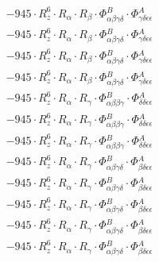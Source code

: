 \documentclass{article}
\begin{document}
\begin{subequations}
\begin{gather}
\begin{array}{c}
 \\[0.2em] 		 - 945 \cdot R_{z}^{6} \cdot R_{\alpha{}} \cdot R_{\beta{}} \cdot \Phi{}^{B}_{\alpha{}\beta{}\gamma{}\delta{}} \cdot \Phi{}^{A}_{\gamma{}\delta{}\epsilon{}\epsilon{}} 
 \\[0.2em] 		 - 945 \cdot R_{z}^{6} \cdot R_{\alpha{}} \cdot R_{\beta{}} \cdot \Phi{}^{B}_{\alpha{}\beta{}\gamma{}\delta{}} \cdot \Phi{}^{A}_{\gamma{}\delta{}\epsilon{}\epsilon{}} 
 \\[0.2em] 		 - 945 \cdot R_{z}^{6} \cdot R_{\alpha{}} \cdot R_{\beta{}} \cdot \Phi{}^{B}_{\alpha{}\beta{}\gamma{}\delta{}} \cdot \Phi{}^{A}_{\gamma{}\delta{}\epsilon{}\epsilon{}} 
 \\[0.2em] 		 - 945 \cdot R_{z}^{6} \cdot R_{\alpha{}} \cdot R_{\beta{}} \cdot \Phi{}^{B}_{\alpha{}\beta{}\gamma{}\delta{}} \cdot \Phi{}^{A}_{\gamma{}\delta{}\epsilon{}\epsilon{}} 
 \\[0.2em] 		 - 945 \cdot R_{z}^{6} \cdot R_{\alpha{}} \cdot R_{\gamma{}} \cdot \Phi{}^{B}_{\alpha{}\beta{}\beta{}\gamma{}} \cdot \Phi{}^{A}_{\delta{}\delta{}\epsilon{}\epsilon{}} 
 \\[0.2em] 		 - 945 \cdot R_{z}^{6} \cdot R_{\alpha{}} \cdot R_{\gamma{}} \cdot \Phi{}^{B}_{\alpha{}\beta{}\beta{}\gamma{}} \cdot \Phi{}^{A}_{\delta{}\delta{}\epsilon{}\epsilon{}} 
 \\[0.2em] 		 - 945 \cdot R_{z}^{6} \cdot R_{\alpha{}} \cdot R_{\gamma{}} \cdot \Phi{}^{B}_{\alpha{}\beta{}\beta{}\gamma{}} \cdot \Phi{}^{A}_{\delta{}\delta{}\epsilon{}\epsilon{}} 
 \\[0.2em] 		 - 945 \cdot R_{z}^{6} \cdot R_{\alpha{}} \cdot R_{\gamma{}} \cdot \Phi{}^{B}_{\alpha{}\beta{}\gamma{}\delta{}} \cdot \Phi{}^{A}_{\beta{}\delta{}\epsilon{}\epsilon{}} 
 \\[0.2em] 		 - 945 \cdot R_{z}^{6} \cdot R_{\alpha{}} \cdot R_{\gamma{}} \cdot \Phi{}^{B}_{\alpha{}\beta{}\gamma{}\delta{}} \cdot \Phi{}^{A}_{\beta{}\delta{}\epsilon{}\epsilon{}} 
 \\[0.2em] 		 - 945 \cdot R_{z}^{6} \cdot R_{\alpha{}} \cdot R_{\gamma{}} \cdot \Phi{}^{B}_{\alpha{}\beta{}\gamma{}\delta{}} \cdot \Phi{}^{A}_{\beta{}\delta{}\epsilon{}\epsilon{}} 
 \\[0.2em] 		 - 945 \cdot R_{z}^{6} \cdot R_{\alpha{}} \cdot R_{\gamma{}} \cdot \Phi{}^{B}_{\alpha{}\beta{}\gamma{}\delta{}} \cdot \Phi{}^{A}_{\beta{}\delta{}\epsilon{}\epsilon{}} 
 \\[0.2em] 		 - 945 \cdot R_{z}^{6} \cdot R_{\alpha{}} \cdot R_{\gamma{}} \cdot \Phi{}^{B}_{\alpha{}\beta{}\gamma{}\delta{}} \cdot \Phi{}^{A}_{\beta{}\delta{}\epsilon{}\epsilon{}} 

\end{array}
\end{gather}
\end{subequations}
\end{document}
